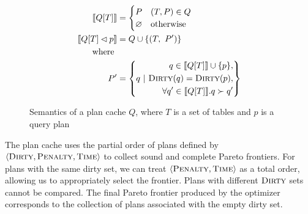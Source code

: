\begin{figure}
  \begin{align*}
    \llbracket Q[T] \rrbracket &= \begin{cases}
      P & (T, P) \in Q \\
      \varnothing & \text{otherwise} \\
    \end{cases} \\
    \llbracket Q[T] \lhd p \rrbracket &= \begin{aligned} Q \cup \{(T,\ P') \} \end{aligned}\\
                                            \text{ where } \\
                                           P' &= \left\{q ~|~ \begin{aligned}
                                                                     q \in \llbracket Q[T] \rrbracket \cup \{p\}, \\
                                                                     \textsc{Dirty}(q) = \textsc{Dirty}(p),\\
                                                                     \forall q' \in \llbracket Q[T] \rrbracket.  q \succ q' 
                                                                   \end{aligned}
                                           \right\}
  \end{align*}
  \caption{Semantics of a plan cache $Q$, where $T$ is a set of tables and $p$ is a query plan}
  \label{fig:semantics-plan-cache}
\end{figure}

The plan cache uses the partial order of plans defined by  $\langle \textsc{Dirty}, \textsc{Penalty}, \textsc{Time} \rangle$ to
collect sound and complete Pareto frontiers. For plans with the same dirty set, we can treat $\langle \textsc{Penalty}, \textsc{Time} \rangle$
as a total order, allowing us to appropriately select the frontier. Plans with different $\textsc{Dirty}$ sets cannot be compared. The final
Pareto frontier produced by the optimizer corresponds to the collection of plans associated with the empty dirty set.

